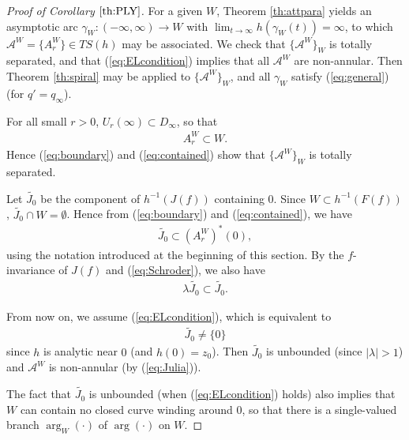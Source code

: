 \documentclass[a4paper,12pt]{amsart}
\theoremstyle{plain}
\theoremstyle{definition}
\theoremstyle{remark}
\numberwithin{equation}{section}
\begin{document}
\begin{proof}[Proof of Corollary $\ref{th:PLY}$]
For a given $W$, Theorem \ref{th:attpara} yields an asymptotic arc 
$\gamma_W:(-\infty,\infty)\to W$ with $\lim_{t\to\infty}h(\gamma_W(t))=\infty$,
to which $\mathcal{A}^W=\{A_r^W\}\in{\mathit{TS}}(h)$ may be associated.
We check that $\{\mathcal{A}^W\}_W$ is totally separated, and
that (\ref{eq:ELcondition}) implies that all $\mathcal{A}^W$ are non-annular.
Then Theorem \ref{th:spiral} may be applied to $\{\mathcal{A}^W\}_W$,
and all $\gamma_W$ satisfy (\ref{eq:general}) (for $q'=q_{\infty}$).

For all small $r>0$, $U_r(\infty)\subset D_{\infty}$, so that
\begin{gather}
 A^W_r\subset W.\label{eq:contained}
\end{gather}
Hence (\ref{eq:boundary}) and (\ref{eq:contained}) show that
$\{\mathcal{A}^W\}_W$ is totally separated.

Let $\tilde{J_0}$ be the component of $h^{-1}(J(f))$ containing $0$.
Since $W\subset h^{-1}(F(f))$, $\tilde{J_0}\cap W=\emptyset$.
Hence from (\ref{eq:boundary}) and (\ref{eq:contained}), we have 
\begin{gather}
 \tilde{J_0}\subset(A^W_r)^*(0),\label{eq:Julia}
\end{gather}
using the notation introduced at the beginning of this section. 
By the $f$-invariance of $J(f)$ and (\ref{eq:Schroder}), we also have
\begin{gather*}
 \lambda\tilde{J_0}\subset\tilde{J_0}. 
\end{gather*}

From now on, we assume (\ref{eq:ELcondition}), which is equivalent to
\begin{gather*}
 \tilde{J_0}\neq\{0\} 
\end{gather*}
since $h$ is analytic near $0$ (and $h(0)=z_0$).
Then $\tilde{J_0}$ is unbounded (since $|\lambda|>1$) and 
$\mathcal{A}^W$ is non-annular (by (\ref{eq:Julia})). 

The fact that $\tilde{J_0}$ is unbounded (when (\ref{eq:ELcondition}) holds)
also implies that $W$ can contain no closed curve winding around $0$,
so that there is a single-valued branch $\arg_W(\cdot)$ of $\arg(\cdot)$ on $W$.


\end{proof}
\end{document}
